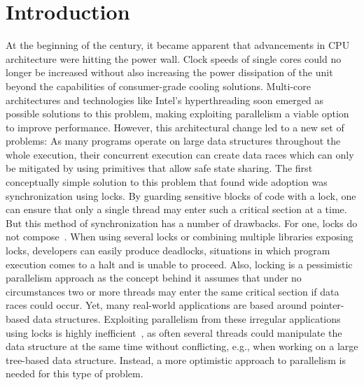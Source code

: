 %
\chapter{Introduction}
\label{sec:introduction}

At the beginning of the century, it became apparent that advancements in CPU architecture were hitting the power wall.
Clock speeds of single cores could no longer be increased without also increasing the power dissipation of the unit beyond the capabilities of consumer-grade cooling solutions.
Multi-core architectures and technologies like Intel's hyperthreading soon emerged as possible solutions to this problem, making exploiting parallelism a viable option to improve performance.
However, this architectural change  led to a new set of problems:
As many programs operate on large data structures throughout the whole execution, their concurrent execution can create data races which can only be mitigated by using primitives that allow safe state sharing.
The first conceptually simple solution to this problem that found wide adoption was synchronization using locks.
By guarding sensitive blocks of code with a lock, one can ensure that only a single thread may enter such a critical section at a time.
But this method of synchronization has a number of drawbacks.
For one, locks do not compose~\cite{lee2006problem}.
When using several locks or combining multiple libraries exposing locks, developers can easily produce deadlocks, situations in which program execution comes to a halt and is unable to proceed.
Also, locking is a pessimistic parallelism approach as the concept behind it assumes that under no circumstances two or more threads may enter the same critical section if data races could occur.
Yet, many real-world applications are based around pointer-based data structures.
Exploiting parallelism from these irregular applications using locks is highly inefficient~\cite{kulkarni2009much}, as often several threads could manipulate the data structure at the same time without conflicting, e.g., when working on a large tree-based data structure.
Instead, a more optimistic approach to parallelism is needed for this type of problem.

